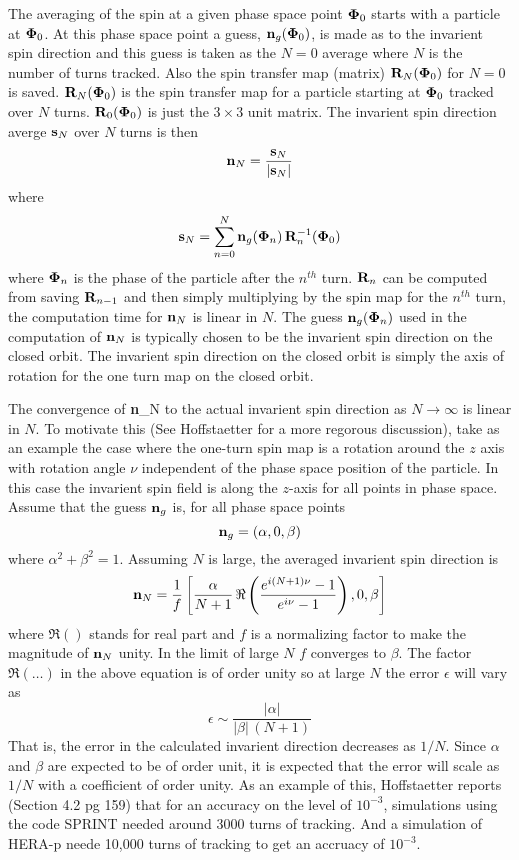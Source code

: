 \documentclass{hitec}
\newcommand{\Bf}[1]{{\bf #1}}
\newcommand{\bfn}{{\Bf n}}
\newcommand{\bfs}{{\Bf s}}
\newcommand{\bfR}{{\Bf R}}
\newcommand{\bfPhi}{{\Bf \Phi}}
\newcommand{\Begineq}{\begin{equation}}
\newcommand{\Endeq}{\end{equation}}
\newcommand{\Th}{$^{th}$\xspace}
\begin{document}
The averaging of the spin at a given phase space point $\bfPhi_0$ starts with a particle at
$\bfPhi_0$. At this phase space point a guess, $\bfn_g(\bfPhi_0)$, is made as to the invarient spin
direction and this guess is taken as the $N = 0$ average where $N$ is the number of turns
tracked. Also the spin transfer map (matrix) $\bfR_N(\bfPhi_0)$ for $N = 0$ is
saved. $\bfR_N(\bfPhi_0)$ is the spin transfer map for a particle starting at $\bfPhi_0$ tracked
over $N$ turns. $\bfR_0(\bfPhi_0)$ is just the $3 \times 3$ unit matrix. The invarient spin
direction averge $\bfs_N$ over $N$ turns is then
\Begineq
  \bfn_N = \frac{ \bfs_N }{ | \bfs_N | }
\Endeq
where
\Begineq
  \bfs_N = \sum_{n = 0}^N \bfn_g(\bfPhi_n) \, \bfR_n^{-1}(\bfPhi_0)
  \label{snng}
\Endeq
where $\bfPhi_n$ is the phase of the particle after the $n$\Th turn. $\bfR_n$ can be computed
from saving $\bfR_{n-1}$ and then simply multiplying by the spin map for the $n$\Th turn, the
computation time for $\bfn_N$ is linear in $N$. The guess $\bfn_g(\bfPhi_n)$ used in the computation
of $\bfn_N$ is typically chosen to be the invarient spin direction on the closed orbit. The
invarient spin direction on the closed orbit is simply the axis of rotation for the one turn map
on the closed orbit. 

The convergence of \bfn_N to the actual invarient spin direction as $N \rightarrow \infty$ is linear
in $N$. To motivate this (See Hoffstaetter for a more regorous discussion), take as an example the
case where the one-turn spin map is a rotation around the $z$ axis with rotation angle $\nu$
independent of the phase space position of the particle. In this case the invarient spin field is
along the $z$-axis for all points in phase space. Assume that the guess $\bfn_g$ is, for all phase
space points
\Begineq
  \bfn_g = (\alpha, 0, \beta)
\Endeq
where $\alpha^2 + \beta^2 = 1$. Assuming $N$ is large, the averaged invarient spin direction is
\Begineq
  \bfn_N = \frac{1}{f} \left[ \frac{\alpha}{N+1} \, 
    \Re \left( \frac{e^{i (N+1) \nu} - 1}{e^{i \nu} - 1} \right),
    0, \beta \right]
\Endeq
where $\Re()$ stands for real part and $f$ is a normalizing factor to make the magnitude of $\bfn_N$
unity. In the limit of large $N$ $f$ converges to $\beta$. The factor $\Re(\ldots)$ in the above
equation is of order unity so at large $N$ the error $\epsilon$ will vary as
\Begineq
  \epsilon \sim \frac{|\alpha|}{|\beta| \, (N+1)}
\Endeq
That is, the error in the calculated invarient direction decreases as $1/N$. Since $\alpha$ and
$\beta$ are expected to be of order unit, it is expected that the error will scale as $1/N$ with a
coefficient of order unity. As an example of this, Hoffstaetter reports (Section 4.2 pg 159) that
for an accuracy on the level of $10^{-3}$, simulations using the code SPRINT needed around 3000
turns of tracking. And a simulation of HERA-p neede 10,000 turns of tracking to get an accruacy of
$10^{-3}$.
\end{document}
